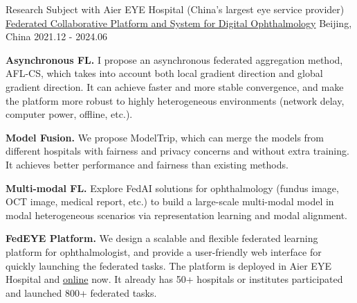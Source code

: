 \begin{cventries}
\cventry
{Research Subject with Aier EYE Hospital (China's largest eye service provider)} %
{\href{https://fedeye.aierchina.com/}{Federated Collaborative Platform and System for Digital Ophthalmology}} %
{Beijing, China} %
{2021.12 - 2024.06} %
{
    \begin{cvitems}
        \item {\textbf{Asynchronous FL.} I propose an asynchronous federated aggregation method, AFL-CS, which takes into account both local gradient direction and global gradient direction. It can achieve faster and more stable convergence, and make the platform more robust to highly heterogeneous environments (network delay, computer power, offline, etc.).}
        \item {\textbf{Model Fusion.} We propose ModelTrip, which can merge the models from different hospitals with fairness and privacy concerns and without extra training. It achieves better performance and fairness than existing methods.}
        \item {\textbf{Multi-modal FL.} Explore FedAI solutions for ophthalmology (fundus image, OCT image, medical report, etc.) to build a large-scale multi-modal model in modal heterogeneous scenarios via representation learning and modal alignment.}
        \item {\textbf{FedEYE Platform.} We design a scalable and flexible federated learning platform for ophthalmologist, 
            and provide a user-friendly web interface for quickly launching the federated tasks. 
            The platform is deployed in Aier EYE Hospital and \textcolor{awesome-red}{\href{https://fedeye.aierchina.com/}{online}} now. 
            It already has \textcolor{awesome-red}{50+} hospitals or institutes participated and launched \textcolor{awesome-red}{800+} federated tasks.}
    \end{cvitems}
}



\end{cventries}
